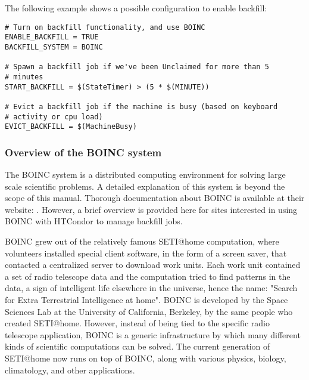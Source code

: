 The following example shows a possible configuration to enable
backfill:

\footnotesize
\begin{verbatim}
# Turn on backfill functionality, and use BOINC
ENABLE_BACKFILL = TRUE
BACKFILL_SYSTEM = BOINC

# Spawn a backfill job if we've been Unclaimed for more than 5
# minutes 
START_BACKFILL = $(StateTimer) > (5 * $(MINUTE))

# Evict a backfill job if the machine is busy (based on keyboard
# activity or cpu load)
EVICT_BACKFILL = $(MachineBusy)
\end{verbatim}
\normalsize


\subsubsection{\label{sec:Backfill-BOINC-overview}Overview of the
 BOINC system}


The BOINC system is a distributed computing environment for solving
large scale scientific problems.
A detailed explanation of this system is beyond the scope of this
manual.
Thorough documentation about BOINC is available at their website:
.
However, a brief overview is provided here for sites interested in
using BOINC with HTCondor to manage backfill jobs. 

BOINC grew out of the relatively famous SETI@home computation, where
volunteers installed special client software, in the form of a
screen saver, that contacted a centralized server to download work
units.
Each work unit contained a set of radio telescope data and the
computation tried to find patterns in the data, a sign of intelligent
life elsewhere in the universe, hence the name: "Search for Extra
Terrestrial Intelligence at home".
BOINC is developed by the Space Sciences Lab at the University of
California, Berkeley, by the same people who created SETI@home.
However, instead of being tied to the specific radio telescope
application, BOINC is a generic infrastructure by which many different
kinds of scientific computations can be solved.
The current generation of SETI@home now runs on top of BOINC, along
with various physics, biology, climatology, and other applications.

